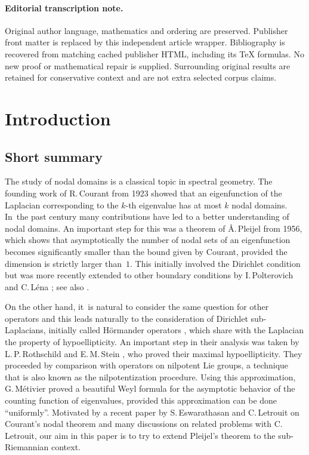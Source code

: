 \documentclass[11pt]{article}
\theoremstyle{definition}
\newcommand{\1}{\mathbbm{1}}
\numberwithin{equation}{section}
\begin{document}
\paragraph{Editorial transcription note.}
Original author language, mathematics and ordering are preserved. Publisher front matter is replaced by this independent article wrapper. Bibliography is recovered from matching cached publisher HTML, including its TeX formulas. No new proof or mathematical repair is supplied. Surrounding original results are retained for conservative context and are not extra selected corpus claims.
\clearpage

\section{Introduction}\label{s0}

\subsection{Short summary}
The study of nodal domains is a classical topic in spectral geometry. The founding work of R.\,Courant \cite{CH} from 1923 showed that an eigenfunction of the Laplacian corresponding to the $k$-th eigenvalue has at most $k$ nodal domains. In~the past century many contributions have led to a better understanding of nodal domains. An important step for this was a theorem of \AA.\,Pleijel \cite{Pl} from 1956, which shows that asymptotically the number of nodal sets of an eigenfunction becomes significantly smaller than the bound given by Courant, provided the dimension is strictly larger than~$1$. This initially involved the Dirichlet condition but was more recently extended to other boundary conditions by I.\,Polterovich \cite{Po} and C.\,Léna \cite{Le}; see also \cite{DFV}.

On the other hand, it~is natural to consider the same question for other operators and this leads naturally to the consideration of Dirichlet sub-Laplacians, initially called Hörmander operators \cite{Ho}, which share with the Laplacian the property of hypoellipticity. An important step in
their analysis was taken by L.\,P.\,Rothschild and E.\,M.\,Stein \cite{RS}, who proved their maximal hypoellipticity. They proceeded by comparison with operators on nilpotent Lie groups, a technique that is also known as the nilpotentization procedure. Using this approximation, G.\,Métivier \cite{Me} proved a beautiful Weyl formula for the asymptotic behavior of the counting function of eigenvalues, provided this approximation can be done ``uniformly''. Motivated by a recent paper \cite{EL} by S.\,Eswarathasan and C.\,Letrouit on Courant's nodal theorem and many discussions on related problems with C.\,Letrouit, our aim in this paper is to try to extend Pleijel's theorem to the sub-Riemannian context.
\end{document}
